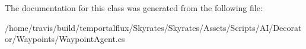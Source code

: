 The documentation for this class was generated from the following file\-:\begin{DoxyCompactItemize}
\item 
/home/travis/build/temportalflux/\-Skyrates/\-Skyrates/\-Assets/\-Scripts/\-A\-I/\-Decorator/\-Waypoints/Waypoint\-Agent.\-cs\end{DoxyCompactItemize}
